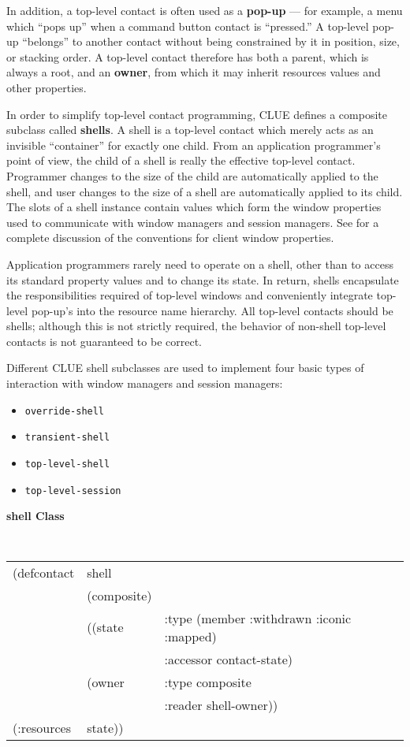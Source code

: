 \documentclass[twoside]{book}
\begin{document}
\begin{sloppy}
In addition, a top-level contact is often used as a {\bf pop-up}
--- for example, a menu which ``pops up'' when a command button contact is
``pressed.'' A top-level pop-up ``belongs'' to another contact without being
constrained by it in position, size, or stacking order. A top-level contact
therefore has both a parent, which is always a root, and an {\bf
owner}, from which it may inherit resources
values and other properties.

In order to simplify top-level contact programming, CLUE defines a composite
subclass called {\bf shells}. A shell is a top-level contact which
merely acts as an invisible ``container'' for exactly one child. From an
application programmer's point of view, the child of a shell is really the
effective top-level contact. Programmer changes to the size of the child are
automatically applied to the shell, and user changes to the size of a shell are
automatically applied to its child. The slots of a shell instance contain
values which form the window properties used to communicate with window managers
and session managers. See \cite{icccm} for a complete discussion of the
conventions for client window properties.

Application programmers rarely need to operate on a shell, other than to access
its standard property values and to change its state. In return, shells
encapsulate the responsibilities required of top-level windows and conveniently
integrate top-level pop-up's into the resource name hierarchy. All top-level
contacts should be shells; although this is not strictly required, the behavior
of non-shell top-level contacts is not guaranteed to be correct.

Different CLUE shell subclasses are used to implement four basic types
of interaction with window managers and session managers:

\begin{itemize}
\item {\tt override-shell}
\item {\tt transient-shell}
\item {\tt top-level-shell}
\item {\tt top-level-session}
\end{itemize}


{\samepage 
{\large {\bf shell \hfill Class}} 
\begin{flushright} \parbox[t]{6.125in}{
\tt
\begin{tabular}{lll}
\raggedright
(defcontact & shell  & \\ 
& (composite) & \\
& ((state     &  :type (member :withdrawn :iconic :mapped)\\
&	      &  :accessor contact-state) \\  
&  (owner     &  :type     composite\\
&	      & :reader   shell-owner))\\
(:resources & state))


\end{tabular}}
\end{flushright}}
\end{sloppy}
\end{document}
